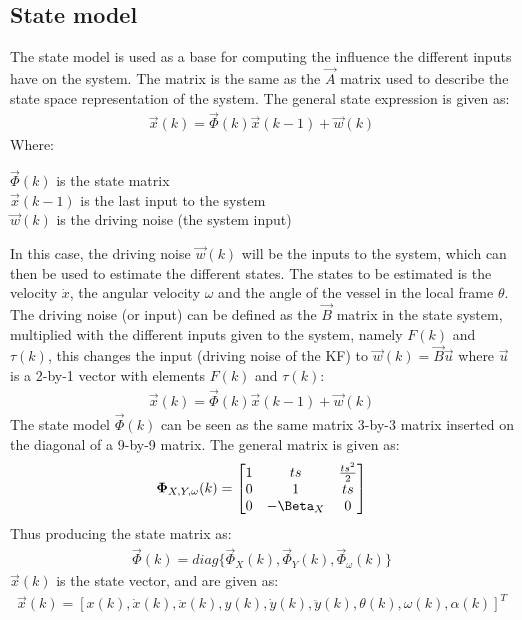 \subsection{State model}
The state model is used as a base for computing the influence the different inputs have on the system. The matrix is the same as the $\vec{A}$ matrix used to describe the state space representation of the system. The general state expression is given as:
\begin{align}
\vec{x}(k) = \vec{\Phi}(k)\vec{x}(k-1) + \vec{w}(k)
\end{align}
\noindent Where:
\begin{ffk}
$\vec{\Phi}(k)$ is the state matrix\\
$\vec{x}(k-1)$ is the last input to the system\\
$\vec{w}(k)$ is the driving noise (the system input)
\end{ffk}
In this case, the driving noise $\vec{w}(k)$ will be the inputs to the system, which can then be used to estimate the different states. The states to be estimated is the velocity $\dot{x}$, the angular velocity $\omega$ and the angle of the vessel in the local frame $\theta$. The driving noise (or input) can be defined as the $\vec{B}$ matrix in the state system, multiplied with the different inputs given to the system, namely $F(k)$ and $\tau(k)$, this changes the input (driving noise of the \ac{KF}) to $\vec{w}(k) = \vec{B} \vec{u}$ where $\vec{u}$ is a 2-by-1 vector with elements $F(k)$ and $\tau(k)$:
\begin{align}
\vec{x}(k) = \vec{\Phi}(k)\vec{x}(k-1) + \vec{w}(k)
\end{align}
The state model $\vec{\Phi}(k)$ can be seen as the same matrix 3-by-3 matrix inserted on the diagonal of a 9-by-9 matrix. The general matrix is given as:
\begin{align}
\vec{\Phi}_{X,Y,\omega}(k) = \begin{bmatrix}
1 & ts & \frac{ts^2}{2}\\
0 & 1 & ts\\
0 & -\Beta_X & 0
\end{bmatrix}
\end{align}
Thus producing the state matrix as:
\begin{align}
\vec{\Phi}(k) = diag\{\vec{\Phi}_{X}(k),\vec{\Phi}_{Y}(k),\vec{\Phi}_{\omega}(k)\} 
\end{align}
$\vec{x}(k)$ is the state vector, and are given as:
\begin{align}
\vec{x}(k) = [x(k),\dot{x}(k),\ddot{x}(k),y(k),\dot{y}(k),\ddot{y}(k),\theta(k),\omega(k),\alpha(k)]^T
\end{align}
